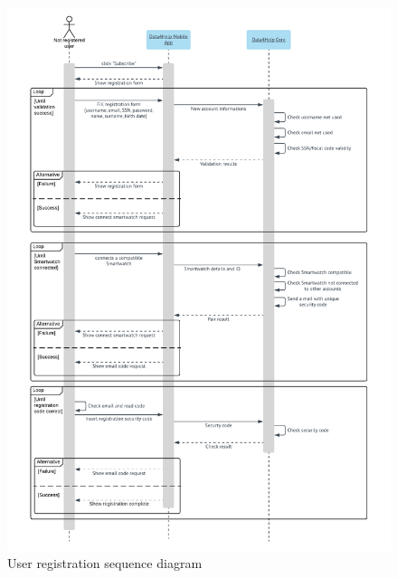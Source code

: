 \begin{figure}[H]
  \includegraphics[width=\textwidth,height=\textheight,keepaspectratio]{assets/sequence/UserRegistration.pdf}
  \caption{User registration sequence diagram}
  \label{fig:UserRegistrationSequence}
\end{figure}

\newpage
